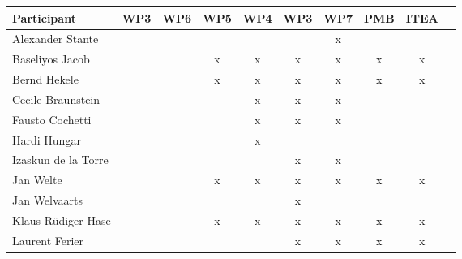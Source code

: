 \documentclass[a4paper, 11pt]{article}
\begin{document}
\begin{tabular}{|l|c|c|c||c|c|c||c|c|c|}
\hline
\textbf{Participant} &  \textbf{WP3} & \textbf{WP6} &  \textbf{WP5} & \textbf{WP4}&  \textbf{WP3} & \textbf{WP7}&  \textbf{PMB} & \textbf{ITEA} \\\hline
Alexander Stante      &   &   &   &   &   & x &   &   \\\hline 
Baseliyos Jacob       &   &   & x & x & x & x & x & x \\\hline 
Bernd Hekele          &   &   & x & x & x & x & x & x \\\hline
Cecile Braunstein     &   &   &   & x & x & x &   &   \\\hline
Fausto Cochetti       &   &   &   & x & x & x &   &   \\\hline
Hardi Hungar          &   &   &   & x &   &   &   &   \\\hline
Izaskun de la Torre   &   &   &   &   & x & x &   &   \\\hline
Jan Welte             &   &   & x & x & x & x & x & x \\\hline
Jan Welvaarts         &   &   &   &   & x &   &   &   \\\hline
Klaus-R\"udiger Hase  &   &   & x & x & x & x & x & x \\\hline
Laurent Ferier        &   &   &   &   & x & x & x & x \\\hline

\end{tabular}
\end{document}
